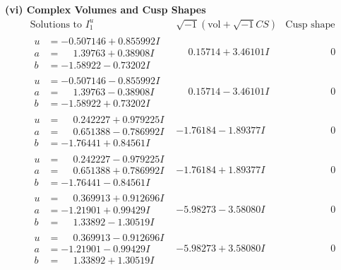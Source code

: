 \documentclass[1p]{elsarticle_modified}
\theoremstyle{definition}
\newcommand{\I}{\sqrt{-1}}
\begin{document}
\newpage\flushleft \textbf{(vi) Complex Volumes and Cusp Shapes}
$$\begin{array}{c|c|c}  
\text{Solutions to }I^u_{1}& \I (\text{vol} + \sqrt{-1}CS) & \text{Cusp shape}\\
 \hline 
\begin{aligned}
u &= -0.507146 + 0.855992 I \\
a &= \phantom{-}1.39763 + 0.38908 I \\
b &= -1.58922 - 0.73202 I\end{aligned}
 & \phantom{-}0.15714 + 3.46101 I & \phantom{-0.000000 } 0 \\ \hline\begin{aligned}
u &= -0.507146 - 0.855992 I \\
a &= \phantom{-}1.39763 - 0.38908 I \\
b &= -1.58922 + 0.73202 I\end{aligned}
 & \phantom{-}0.15714 - 3.46101 I & \phantom{-0.000000 } 0 \\ \hline\begin{aligned}
u &= \phantom{-}0.242227 + 0.979225 I \\
a &= \phantom{-}0.651388 - 0.786992 I \\
b &= -1.76441 + 0.84561 I\end{aligned}
 & -1.76184 - 1.89377 I & \phantom{-0.000000 } 0 \\ \hline\begin{aligned}
u &= \phantom{-}0.242227 - 0.979225 I \\
a &= \phantom{-}0.651388 + 0.786992 I \\
b &= -1.76441 - 0.84561 I\end{aligned}
 & -1.76184 + 1.89377 I & \phantom{-0.000000 } 0 \\ \hline\begin{aligned}
u &= \phantom{-}0.369913 + 0.912696 I \\
a &= -1.21901 + 0.99429 I \\
b &= \phantom{-}1.33892 - 1.30519 I\end{aligned}
 & -5.98273 - 3.58080 I & \phantom{-0.000000 } 0 \\ \hline\begin{aligned}
u &= \phantom{-}0.369913 - 0.912696 I \\
a &= -1.21901 - 0.99429 I \\
b &= \phantom{-}1.33892 + 1.30519 I\end{aligned}
 & -5.98273 + 3.58080 I & \phantom{-0.000000 } 0 \\ \hline\begin{aligned}

\end{aligned}
\end{array}$$
\end{document}
